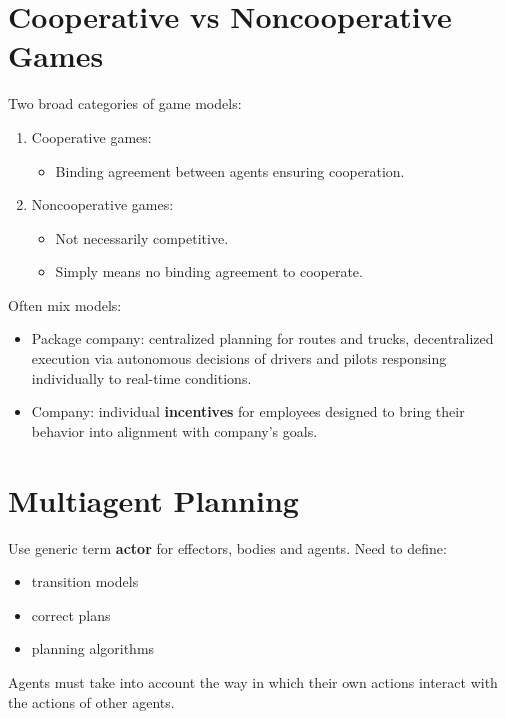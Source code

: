 \documentclass[11pt]{article}
\begin{document}
\section{Cooperative vs Noncooperative Games}
\label{sec:org5db629b}

Two broad categories of game models:

\begin{enumerate}
\item Cooperative games:

\begin{itemize}
\item Binding agreement between agents ensuring cooperation.
\end{itemize}

\item Noncooperative games:

\begin{itemize}
\item Not necessarily competitive.
\item Simply means no binding agreement to cooperate.
\end{itemize}
\end{enumerate}

Often mix models:

\begin{itemize}
\item Package company: centralized planning for routes and trucks, decentralized execution via autonomous decisions of drivers and pilots responsing individually to real-time conditions.
\item Company: individual \textbf{incentives} for employees designed to bring their behavior into alignment with company's goals.
\end{itemize}
\section{Multiagent Planning}
\label{sec:org07589b6}

Use generic term \textbf{actor} for effectors, bodies and agents.  Need to define:

\begin{itemize}
\item transition models
\item correct plans
\item planning algorithms
\end{itemize}

Agents must take into account the way in which their own actions interact with the actions of other agents.
\end{document}
